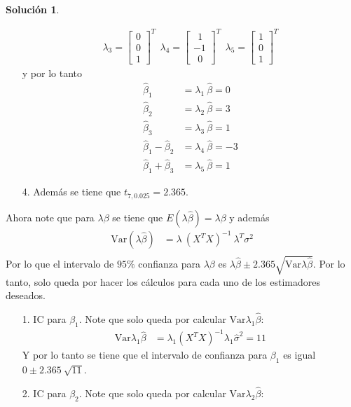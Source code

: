 \documentclass[12pt]{article}
\theoremstyle{plain}
\theoremstyle{definition}
\theoremstyle{definition}
\theoremstyle{definition}
\newtheorem*{solution}{Solución}
\newcommand{\p}{\text{.}}
\newcommand{\var}{\text{Var}}
\begin{document}
\begin{solution}
\begin{itemize}
\begin{align*}
    \lambda_3 = \begin{bmatrix} 0 \\ 0 \\ 1 
    \end{bmatrix}^T \ \ 
    \lambda_4 = \begin{bmatrix} \ \ 1 \\ -1 \\ \ \ 0 
    \end{bmatrix}^T \ \ 
    \lambda_5 = \begin{bmatrix} 1 \\ 0 \\ 1 
    \end{bmatrix}^T
\end{align*} 
y por lo tanto
\begin{align*}
    \hat{\beta}_1 &= \lambda_1 \ \hat{\beta} =  0  \\
    \hat{\beta}_2 &= \lambda_2 \ \hat{\beta} =  3  \\
    \hat{\beta}_3 &= \lambda_3 \ \hat{\beta} =  1  \\
    \hat{\beta}_1 - \hat{\beta}_2 &= \lambda_4 \ \hat{\beta} =  -3  \\
    \hat{\beta}_1 + \hat{\beta}_3 &= \lambda_5 \ \hat{\beta} =  1 
\end{align*}
    \item[4.] Además se tiene que $t_{7,0\p025} = 2 \p 365$. 
\end{itemize}
Ahora note que para $\lambda \beta$ se tiene que $E(\lambda \hat \beta) = \lambda \beta$ y además 
\begin{align*}
    \var(\lambda \hat \beta)  &= \lambda \ (X^TX)^{-1}  \ \lambda^T  \sigma^2 \\
\end{align*}
Por lo que el intervalo de $95\%$ confianza para $\lambda \beta$ es $\lambda\hat \beta \pm 2\p365 \sqrt{\var \lambda\hat \beta}$. Por lo tanto, solo queda por hacer los cálculos para cada uno de los estimadores deseados.
\begin{itemize}
    \item[1.] IC para $\beta_1$. Note que solo queda por calcular $\var \lambda_1 \hat \beta$: 
    \begin{align*}
        \var \lambda_1 \hat \beta &= \lambda_1 (X^TX)^{-1} \lambda_1 \hat{\sigma}^2 = 11
    \end{align*}
    Y por lo tanto se tiene que el intervalo de confianza para $\beta_1$ es igual $0 \pm 2\p365 \ \sqrt{11}$.
    \item[2.] IC para $\beta_2$. Note que solo queda por calcular $\var \lambda_2 \hat \beta$: 

\end{itemize}
\end{solution}
\end{document}
